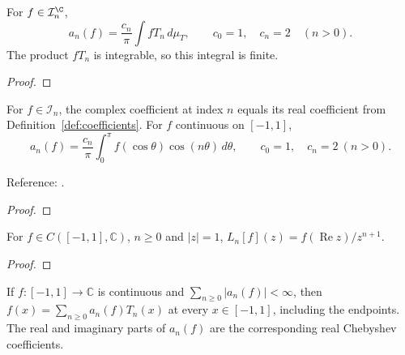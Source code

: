 \begin{supporting}
\begin{theorem}
\label{thm:complex-coefficient-characterisation}
\leanok
For $f\in\mathcal I_n^{\C}$,
\[a_n(f)=\frac{c_n}{\pi}\int fT_n\,d\mu_T,
\qquad c_0=1,\quad c_n=2\quad(n>0).\]
The product $fT_n$ is integrable, so this integral is finite.
\end{theorem}
\begin{proof}
\leanok
\end{proof}

\begin{theorem}
\label{thm:complex-coefficients-basic}
\leanok
For $f\in\mathcal I_n$, the complex coefficient at index $n$
equals its real coefficient from Definition~\ref{def:coefficients}. For $f$ continuous on $[-1,1]$,
\[a_n(f)=\frac{c_n}{\pi}\int_0^\pi f(\cos\theta)\cos(n\theta)\,d\theta,
\qquad c_0=1,\quad c_n=2\ (n>0).\]

Reference: \cite[Chapters 3 and 8]{atap}.
\end{theorem}
\begin{proof}
\leanok
\end{proof}

\begin{theorem}
\label{thm:joukowski-laurent-input}
\leanok
For $f\in C([-1,1],\mathbb C)$, $n\ge0$ and $|z|=1$,
$L_n[f](z)=f(\operatorname{Re}z)/z^{n+1}$.
\end{theorem}
\begin{proof}
\leanok
\end{proof}

\begin{theorem}
\label{thm:complex-series-representation}
\leanok
If $f:[-1,1]\to\mathbb C$ is continuous and $\sum_{n\ge0}|a_n(f)|<\infty$,
then $f(x)=\sum_{n\ge0}a_n(f)T_n(x)$ at every $x\in[-1,1]$, including the
endpoints. The real and imaginary parts of $a_n(f)$ are the corresponding
real Chebyshev coefficients.


\end{theorem}
\end{supporting}
